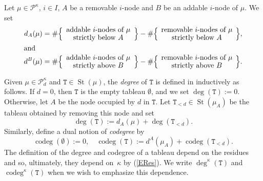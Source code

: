 \documentclass[twoside,11pt,reqno]{amsart}
\numberwithin{equation}{section}
\theoremstyle{definition}  %
\newcommand{\St}{\operatorname{St}}
\newcommand{\0}{{\bar 0}}
\newcommand{\1}{{\bar 1}}
\newcommand{\La}{\Lambda}
\newcommand{\al}{\alpha}
\newcommand\Par[1][]{{\mathscr P}^{\kappa#1}}
\def\T{{\mathtt T}}
\def\codeg{\operatorname{codeg}}
\newcommand\SetBox[2][35mm]{\Big\{\vcenter{\hsize#1\centering#2}\Big\}}
\begin{document}
Let $\mu\in\Par$, $i\in I$, $A$ be a removable $i$-node and $B$ be an addable $i$-node 
of $\mu$. We set
\begin{align}\label{EDMUA}
d_A(\mu)&=\#\SetBox{addable $i$-nodes of $\mu$\\[-4pt] strictly below $A$}
                -\#\SetBox[38mm]{removable $i$-nodes of $\mu$\\[-4pt] strictly below $A$},\\
\intertext{and}
d^B(\mu)&=\#\SetBox{addable $i$-nodes of $\mu$\\[-4pt] strictly above $B$}
                -\#\SetBox[38mm]{removable $i$-nodes of $\mu$\\[-4pt] strictly above $B$}.
\end{align} 



Given $\mu \in \Par_d$ and $\T \in \St(\mu)$, the {\em degree} of $\T$ is defined in
\cite[section~3.5]{BKW} inductively as follows. If $d=0$, then $\T$ is the empty tableau $\emptyset$, and
we set $\deg(\T):=0$.  Otherwise, let $A$ be the node occupied by $d$ in $\T$. Let $\T_{<d}\in\St(\mu_A)$
be the tableau obtained by removing this node and set
\begin{equation}\label{EDegTab}
\deg(\T):=d_A(\mu)+\deg(\T_{<d}).
\end{equation}
Similarly, define a dual notion of {\em codegree} by
\begin{equation}\label{ECodeg}
\codeg(\emptyset):=0,\quad \codeg(\T):=d^A(\mu_A)+\codeg(\T_{<d}).
\end{equation}
The definition of the degree and codegree of a tableau depend on the residues and so,
ultimately, they depend on~$\kappa$ by (\ref{ERes}). We write $\deg^\kappa(\T)$ and
$\codeg^\kappa(\T)$ when we wish to emphasize this dependence.
\end{document}

